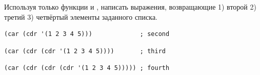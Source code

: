 \documentclass[a4paper]{report}
\begin{document}
\begin{task}
	Используя только функции  и , написать выражения, возвращающие 1) второй 2) третий 3) четвёртый элементы заданного списка.
\end{task}

\begin{AutoMultiColEnumerate}
	\item
\begin{lstlisting}[style=lispinline]
(car (cdr '(1 2 3 4 5)))             ; second
\end{lstlisting}

	\item
\begin{lstlisting}[style=lispinline]
(car (cdr (cdr '(1 2 3 4 5))))       ; third
\end{lstlisting}

	\item
\begin{lstlisting}[style=lispinline]
(car (cdr (cdr (cdr '(1 2 3 4 5))))) ; fourth
\end{lstlisting}
\end{AutoMultiColEnumerate}
\end{document}
